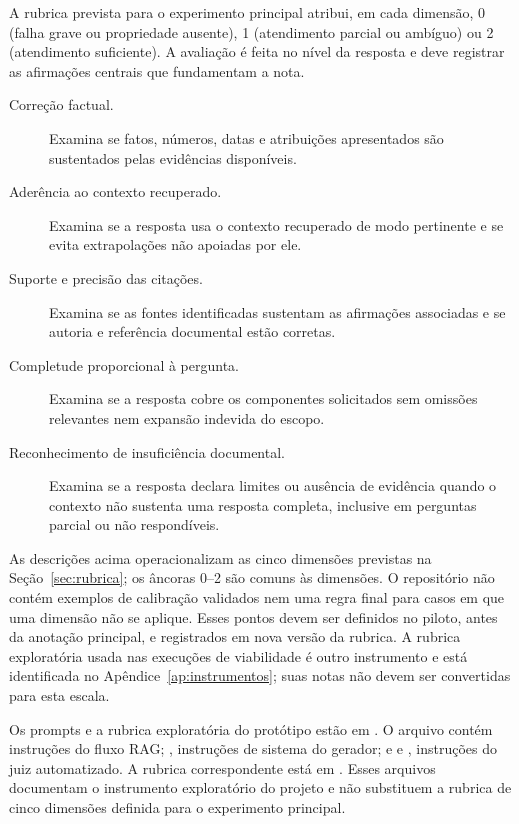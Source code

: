 \label{ap:rubrica}

A rubrica prevista para o experimento principal atribui, em cada dimensão, 0 (falha grave ou propriedade ausente), 1 (atendimento parcial ou ambíguo) ou 2 (atendimento suficiente). A avaliação é feita no nível da resposta e deve registrar as afirmações centrais que fundamentam a nota.

\begin{description}
  \item[Correção factual.] Examina se fatos, números, datas e atribuições apresentados são sustentados pelas evidências disponíveis.
  \item[Aderência ao contexto recuperado.] Examina se a resposta usa o contexto recuperado de modo pertinente e se evita extrapolações não apoiadas por ele.
  \item[Suporte e precisão das citações.] Examina se as fontes identificadas sustentam as afirmações associadas e se autoria e referência documental estão corretas.
  \item[Completude proporcional à pergunta.] Examina se a resposta cobre os componentes solicitados sem omissões relevantes nem expansão indevida do escopo.
  \item[Reconhecimento de insuficiência documental.] Examina se a resposta declara limites ou ausência de evidência quando o contexto não sustenta uma resposta completa, inclusive em perguntas parcial ou não respondíveis.
\end{description}

As descrições acima operacionalizam as cinco dimensões previstas na Seção~\ref{sec:rubrica}; os âncoras 0--2 são comuns às dimensões. O repositório não contém exemplos de calibração validados nem uma regra final para casos em que uma dimensão não se aplique. Esses pontos devem ser definidos no piloto, antes da anotação principal, e registrados em nova versão da rubrica. A rubrica exploratória usada nas execuções de viabilidade é outro instrumento e está identificada no Apêndice~\ref{ap:instrumentos}; suas notas não devem ser convertidas para esta escala.

\label{ap:instrumentos}

Os prompts e a rubrica exploratória do protótipo estão em . O arquivo  contém instruções do fluxo RAG; , instruções de sistema do gerador; e  e , instruções do juiz automatizado. A rubrica correspondente está em . Esses arquivos documentam o instrumento exploratório do projeto e não substituem a rubrica de cinco dimensões definida para o experimento principal.

